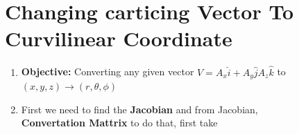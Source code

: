 \documentclass{article}[12pt, a4paper]
\begin{document}
\centering \section*{Changing carticing Vector To Curvilinear Coordinate}
\begin{enumerate}
\item \textbf{Objective: } Converting any given vector $V = A_x \hat{i} + A_y \hat{j} A_z \hat{k}$ to $(x, y, z) \rightarrow (r, \theta, \phi)$
\item First we need to find the \textbf{Jacobian} and from Jacobian, \\ \textbf{Convertation Mattrix}
to do that, first take

\end{enumerate}
\end{document}
